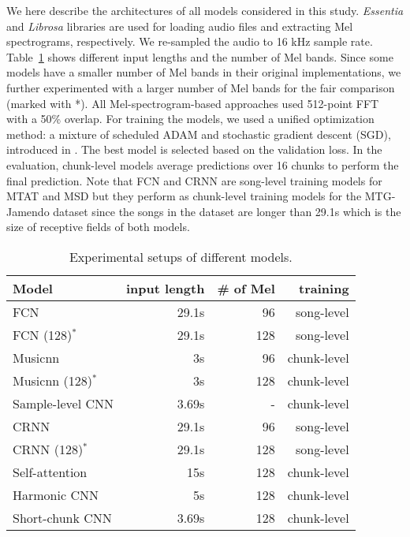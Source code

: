 \documentclass{article}
\begin{document}
We here describe the architectures of all models considered in this study. \textit{Essentia} \cite{bogdanov2013essentia} and \textit{Librosa} \cite{mcfee2015librosa} libraries are used for loading audio files and extracting Mel spectrograms, respectively. We re-sampled the audio to 16 kHz sample rate. 
Table~\ref{tab:rep} shows different input lengths and the number of Mel bands. 
Since some models have a smaller number of Mel bands in their original implementations, we further experimented with a larger number of Mel bands for the fair comparison (marked with \mbox{*}).
All Mel-spectrogram-based approaches used 512-point FFT with a 50\% overlap.
For training the models, we used a unified optimization method: a mixture of scheduled ADAM \cite{kingma2014adam} and stochastic gradient descent (SGD), introduced in \cite{won2019toward}. The best model is selected based on the validation loss. In the evaluation, chunk-level models average predictions over 16 chunks to perform the final prediction. Note that FCN and CRNN are song-level training models for MTAT and MSD but they perform as chunk-level training models for the MTG-Jamendo dataset since the songs in the dataset are longer than 29.1s which is the size of receptive fields of both models.




\begin{table}[t!]
\centering
\footnotesize
\begin{tabular}{@{}l@{}r@{\hskip 0.1in}r@{\hskip 0.1in}r@{}}
\toprule
Model &input length &\# of Mel &training\\ \midrule
FCN &29.1s  &96 &song-level\\
FCN (128)$^{*}$ &29.1s  &128 &song-level\\
Musicnn &3s &96 &chunk-level\\
Musicnn (128)$^{*}$ &3s &128 &chunk-level\\
Sample-level CNN&3.69s  &-  &chunk-level\\
CRNN    &29.1s  &96 &song-level\\
CRNN (128)$^{*}$    &29.1s  &128 &song-level\\
Self-attention  &15s    &128  &chunk-level\\
Harmonic CNN    &5s &128  &chunk-level\\
Short-chunk CNN&3.69s    &128  &chunk-level\\ \bottomrule
\end{tabular}
\caption{Experimental setups of different models.}
\label{tab:rep}
\end{table}
\end{document}
